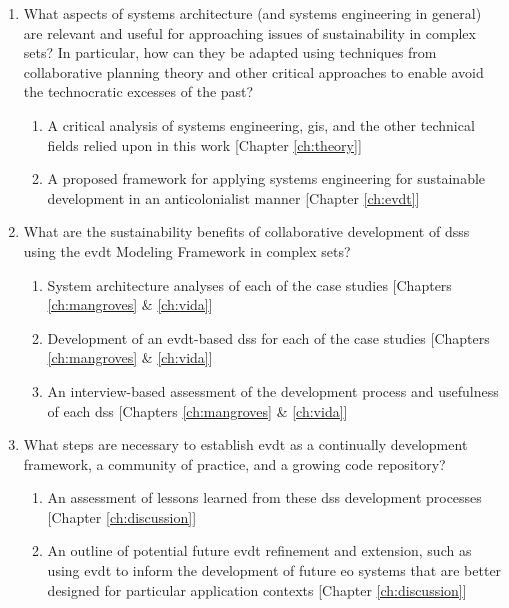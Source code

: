 \begin{enumerate}[itemsep=0pt,parsep=0pt]
	\item{What aspects of systems architecture (and systems engineering in general) are relevant and useful for approaching issues of sustainability in complex \ac{sets}? In particular, how can they be adapted using techniques from collaborative planning theory and other critical approaches to enable avoid the technocratic excesses of the past?}
	\begin{enumerate}[label=\emph{\alph*},itemsep=0pt,parsep=0pt]
		\item{A critical analysis of systems engineering, \ac{gis}, and the other technical fields relied upon in this work [Chapter \ref{ch:theory}] }
		\item{A proposed framework for applying systems engineering for sustainable development in an anticolonialist manner} [Chapter \ref{ch:evdt}]
	\end{enumerate}
	\item{What are the sustainability benefits of collaborative development of \acp{dss} using the \ac{evdt} Modeling Framework in complex \ac{sets}?}
	\begin{enumerate}[label=\emph{\alph*},itemsep=0pt,parsep=0pt]
		\item{System architecture analyses of each of the case studies [Chapters \ref{ch:mangroves} \& \ref{ch:vida}]} 
		\item{Development of an \ac{evdt}-based \ac{dss} for each of the case studies [Chapters \ref{ch:mangroves} \& \ref{ch:vida}]} 
		\item{An interview-based assessment of the development process and usefulness of each \ac{dss} [Chapters \ref{ch:mangroves} \& \ref{ch:vida}]} 
	\end{enumerate}
	\item{What steps are necessary to establish \ac{evdt} as a continually development framework, a community of practice, and a growing code repository?}
	\begin{enumerate}[label=\emph{\alph*},itemsep=0pt,parsep=0pt]
		\item{An assessment of lessons learned from these \ac{dss} development processes [Chapter \ref{ch:discussion}]} 
		\item{An outline of potential future \ac{evdt} refinement and extension, such as using \ac{evdt} to inform the development of future \ac{eo} systems that are better designed for particular application contexts [Chapter \ref{ch:discussion}]}
	\end{enumerate}
\end{enumerate}

